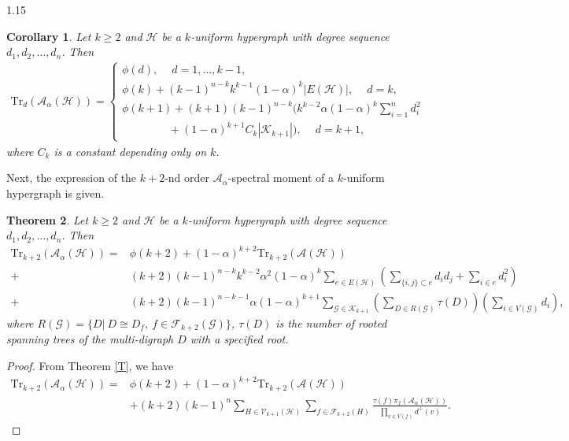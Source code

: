 \documentclass[preprint,12pt]{elsarticle1}
\newtheorem{thm}{Theorem}[section]
\newtheorem{cor}[thm]{Corollary}
\numberwithin{equation}{section}
\begin{document}
\begin{spacing}{1.15}
\begin{cor}\label{firstk+1}
Let $k\ge2$ and $\mathcal{H}$ be a $k$-uniform hypergraph with degree sequence $d_1,d_2,\ldots,d_n$. Then
\begin{align*}
\mathrm{Tr}_d(\mathcal{A}_{\alpha}(\mathcal{H}))=
\begin{cases}
\phi(d),  ~ \quad  d=1,\ldots,k-1,\\
\phi(k)+(k-1)^{n-k}k^{k-1}(1-\alpha)^{k}|E(\mathcal{H})|, ~ \quad  d=k,\\
\phi(k+1)+(k+1)(k-1)^{n-k}\bigg( k^{k-2} \alpha (1-\alpha)^{k} \sum\limits_{i=1}^{n}d_i^2 & \\
~ \quad \quad \quad \quad +(1-\alpha)^{k+1}C_k|\mathcal{K}_{k+1}| \bigg), ~ \quad  d=k+1,
\end{cases}
\end{align*}
where $C_k$ is a constant depending only on $k$.
\end{cor}

Next, the expression of the $k+2$-nd order $\mathcal{A}_{\alpha}$-spectral moment of a $k$-uniform hypergraph is given.

\begin{thm}\label{k+2}
Let $k\ge2$ and $\mathcal{H}$ be a $k$-uniform hypergraph with degree sequence $d_1,d_2,\ldots,d_n$. Then
\begin{align*}
\mathrm{Tr}_{k+2}(\mathcal{A}_{\alpha}(\mathcal{H}))=&\phi(k+2)+(1-\alpha)^{k+2}\mathrm{Tr}_{k+2}(\mathcal{A}(\mathcal{H}))\\
+&(k+2)(k-1)^{n-k}k^{k-2}\alpha^{2}(1-\alpha)^{k}\sum\limits_{e\in E(\mathcal{H})}\left( \sum\limits_{\{i,j\}\subset e}d_id_j+\sum\limits_{i\in e}d_i^2 \right)\\
+&(k+2)(k-1)^{n-k-1}\alpha(1-\alpha)^{k+1}\sum\limits_{\mathcal{G}\in \mathcal{K}_{k+1}}\left( \sum\limits_{D\in R(\mathcal{G})}\tau(D) \right)\left( \sum\limits_{i\in V(\mathcal{G})}d_i \right),
\end{align*}
where $R(\mathcal{G})=\{D|~ D\cong D_f,~ f\in\mathcal{F}_{k+2}(\mathcal{G})\}$, $\tau(D)$ is the number of rooted spanning trees of the multi-digraph $D$ with a specified root.
\end{thm}

\begin{proof}
From Theorem \ref{T}, we have
\begin{equation}\label{k++2}
\begin{aligned}
\mathrm{Tr}_{k+2}(\mathcal{A}_{\alpha}(\mathcal{H}))=&\phi(k+2)+(1-\alpha)^{k+2}\mathrm{Tr}_{k+2}(\mathcal{A}(\mathcal{H}))\\
&+(k+2)(k-1)^{n}\sum\limits_{H\in\mathcal{V}_{k+1}(\mathcal{H})}\sum\limits_{f\in\mathcal{F}_{k+2}(H)}\frac{\tau(f)\pi_{f}(\mathcal{A}_{\alpha}(\mathcal{H}))}{\prod\limits_{v\in V(f)}d^{+}(v)}.
\end{aligned}
\end{equation}


\end{proof}
\end{spacing}
\end{document}
